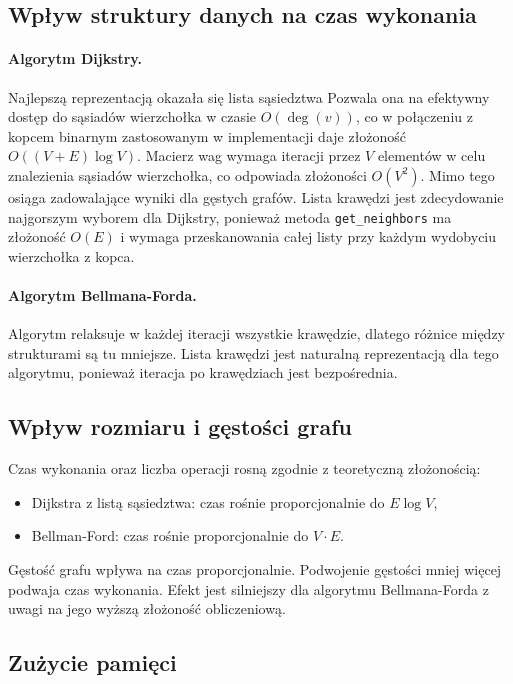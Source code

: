 \documentclass[12pt,a4paper]{article}
\begin{document}
\subsection{Wpływ struktury danych na czas wykonania}

\paragraph{Algorytm Dijkstry.}
Najlepszą reprezentacją okazała się lista sąsiedztwa Pozwala ona na efektywny dostęp do sąsiadów wierzchołka w czasie $O(\deg(v))$, co w połączeniu z kopcem binarnym zastosowanym w implementacji daje złożoność $O((V+E)\log V)$. Macierz wag wymaga iteracji przez $V$ elementów w celu znalezienia sąsiadów wierzchołka, co odpowiada złożoności $O(V^2)$. Mimo tego osiąga zadowalające wyniki dla gęstych grafów. Lista krawędzi jest zdecydowanie najgorszym wyborem dla Dijkstry, ponieważ metoda \texttt{get\_neighbors} ma złożoność $O(E)$ i wymaga przeskanowania całej listy przy każdym wydobyciu wierzchołka z kopca.

\paragraph{Algorytm Bellmana-Forda.}
Algorytm relaksuje w każdej iteracji wszystkie krawędzie, dlatego różnice między strukturami są tu mniejsze. Lista krawędzi jest naturalną reprezentacją dla tego algorytmu, ponieważ iteracja po krawędziach jest bezpośrednia.

\subsection{Wpływ rozmiaru i gęstości grafu}

Czas wykonania oraz liczba operacji rosną zgodnie z teoretyczną złożonością:
\begin{itemize}
    \item Dijkstra z listą sąsiedztwa: czas rośnie proporcjonalnie do $E \log V$,
    \item Bellman-Ford: czas rośnie proporcjonalnie do $V \cdot E$.
\end{itemize}

Gęstość grafu wpływa na czas proporcjonalnie. Podwojenie gęstości mniej więcej podwaja czas wykonania. Efekt jest silniejszy dla algorytmu Bellmana-Forda z uwagi na jego wyższą złożoność obliczeniową.

\subsection{Zużycie pamięci}
\end{document}
